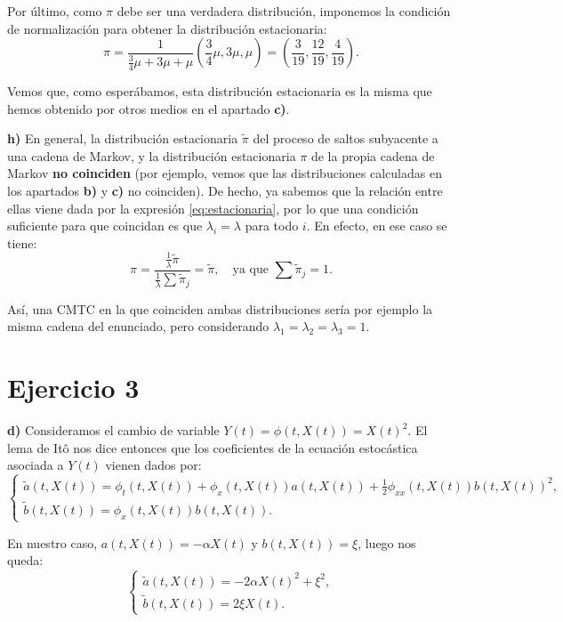 \documentclass[12pt]{article}
\begin{document}
Por último, como $\pi$ debe ser una verdadera distribución, imponemos la condición de normalización para obtener la distribución estacionaria:
\[
\pi = \frac{1}{\frac{3}{4}\mu + 3\mu + \mu}\left(\frac{3}{4}\mu, 3\mu, \mu \right) = \left(\frac{3}{19}, \frac{12}{19}, \frac{4}{19} \right).
\]

Vemos que, como esperábamos, esta distribución estacionaria es la misma que hemos obtenido por otros medios en el apartado \textbf{c)}.

\textbf{h)} En general, la distribución estacionaria $\tilde \pi$ del proceso de saltos subyacente a una cadena de Markov, y la distribución estacionaria $\pi$ de la propia cadena de Markov \textbf{no coinciden} (por ejemplo, vemos que las distribuciones calculadas en los apartados \textbf{b)} y \textbf{c)} no coinciden). De hecho, ya sabemos que la relación entre ellas viene dada por la expresión \eqref{eq:estacionaria}, por lo que una condición suficiente para que coincidan es que $\lambda_i=\lambda$ para todo $i$. En efecto, en ese caso se tiene:
\[
\pi = \frac{\displaystyle \frac{1}{\lambda}\tilde\pi}{\displaystyle \frac{1}{\lambda} \sum \tilde \pi_j}=\tilde\pi, \quad \text{ya que } \sum \tilde \pi_j = 1.
\]

Así, una CMTC en la que coinciden ambas distribuciones sería por ejemplo la misma cadena del enunciado, pero considerando $\lambda_1=\lambda_2=\lambda_3=1$.\\

\section*{Ejercicio 3}

\textbf{d)} Consideramos el cambio de variable $Y(t)=\phi(t, X(t))=X(t)^2$. El lema de Itô nos dice entonces que los coeficientes de la ecuación estocástica asociada a $Y(t)$ vienen dados por:
\[
\begin{cases}
  \tilde a(t, X(t))=\phi_t(t, X(t)) + \phi_x(t,X(t))a(t, X(t)) + \frac{1}{2}\phi_{xx}(t, X(t))b(t, X(t))^2,\\
  \tilde b(t, X(t))=\phi_x(t, X(t))b(t, X(t)).
\end{cases}
\]

En nuestro caso, $a(t, X(t))=-\alpha X(t)$ y $b(t, X(t))=\xi$, luego nos queda:
\[
\begin{cases}
  \tilde a(t, X(t))=-2\alpha X(t)^2 + \xi^2,\\
  \tilde b(t, X(t))=2\xi X(t).
\end{cases}
\]
\end{document}
